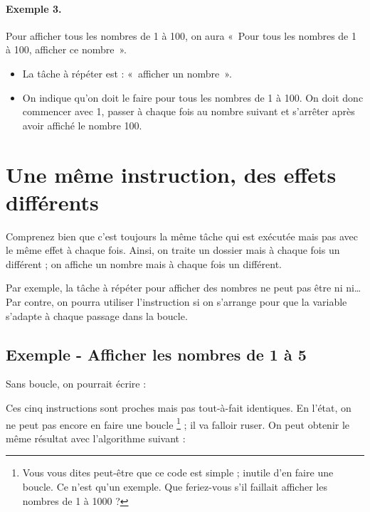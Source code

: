 	\paragraph{Exemple 3.}
	Pour afficher tous les nombres de 1 à 100, on aura
	«~Pour tous les nombres de 1 à 100, afficher ce nombre~».
	\begin{itemize}
	\item
		La tâche à répéter est : «~afficher un nombre~».
	\item 
		On indique qu’on doit le faire pour tous les nombres de 1 à 100. 
		On doit donc commencer avec 1, 
		passer à chaque fois au nombre suivant 
		et s’arrêter après avoir affiché le nombre 100.
	\end{itemize}
		
\section{Une même instruction, des effets différents}

	Comprenez bien que c’est toujours la même tâche qui est exécutée 
	mais pas avec le même effet à chaque fois. 
	Ainsi, on traite un dossier mais à chaque fois un différent ; 
	on affiche un nombre mais à chaque fois un différent. 
	
	Par exemple, la tâche à répéter pour afficher des nombres
	ne peut pas être
	 ni  ni\dots{}
	Par contre, on pourra utiliser l'instruction
	 si on s'arrange pour que la variable
	 s'adapte à chaque passage dans la boucle.

	\subsection{Exemple - Afficher les nombres de 1 à 5}
	
		Sans boucle, on pourrait écrire :
		
		\begin{LDA}
		\end{LDA}
		
		Ces cinq instructions sont proches mais pas tout-à-fait identiques. 
		En l'état, on ne peut pas encore en faire une boucle%
		\footnote{%
			Vous vous dites peut-être que ce code est simple ;
			inutile d'en faire une boucle.
			Ce n'est qu'un exemple.
			Que feriez-vous s'il faillait afficher les nombres
			de 1 à 1000 ?
		} ;
		il va falloir ruser.
		On peut obtenir le même résultat avec l'algorithme suivant :

